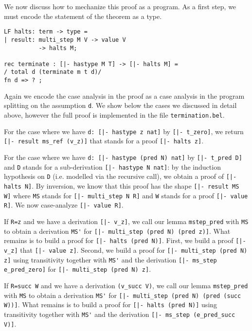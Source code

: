We now discuss how to mechanize this proof as a program. As a first step, we
must encode the statement of the theorem as a type.

\begin{lstlisting}
LF halts: term -> type =
| result: multi_step M V -> value V
          -> halts M;

rec terminate : [|- hastype M T] -> [|- halts M] =
/ total d (terminate m t d)/
fn d => ? ;
\end{lstlisting}

Again we encode the case analysis in the proof as a case analysis in the program
splitting on the assumption \lstinline!d!. We show below the cases we discussed
in detail above, however the full proof is implemented in the file
\lstinline!termination.bel!.

For the case where we have \lstinline!d: [|- hastype z nat]! by
\lstinline![|- t_zero]!, we return \lstinline![|- result ms_ref (v_z)]! that
stands for a proof \lstinline![|- halts z]!.

For the case where we have
\lstinline!d: [|- hastype (pred N) nat]! by \lstinline![|- t_pred D]! and
\lstinline!D! stands for a sub-derivation \lstinline![|- hastype N nat]!: by the
induction hypothesis on \lstinline!D! (i.e. modelled via the recursive call), we
obtain a proof of \lstinline![|- halts N]!.  By inversion, we know that this
proof has the shape \lstinline![|- result MS W]! where \lstinline!MS!
stands for \lstinline![|- multi_step N R]! and \lstinline!W!
stands for a proof \lstinline![|- value R]!. We now case-analyze
\mbox{\lstinline![|- value R]!}.

If \lstinline!R=z! and we have a derivation
\lstinline![|- v_z]!, we call our lemma \lstinline!mstep_pred! with
\lstinline!MS! to obtain a derivation \lstinline!MS'! for
\lstinline![|- multi_step (pred N) (pred z)]!. What remains is to build a proof
for \lstinline![|- halts (pred N)]!. First, we build a proof \lstinline![|- v_z]!
that \lstinline![|- value z]!. Second, we build a proof for
\lstinline![|- multi_step (pred N) z]! using transitivity together with
\lstinline!MS'! and the derivation \lstinline![|- ms_step e_pred_zero]! for
\mbox{\lstinline![|- multi_step (pred N) z]!}.

If \lstinline!R=succ W! and we have a derivation
\lstinline!(v_succ V)!, we call our lemma \lstinline!mstep_pred! with
\lstinline!MS! to obtain a derivation \lstinline!MS'! for
\lstinline![|- multi_step (pred N) (pred (succ W))]!. What remains is to build a proof
for \lstinline![|- halts (pred N)]! using transitivity together with
\lstinline!MS'! and the derivation
\lstinline![|- ms_step (e_pred_succ V)]!.

